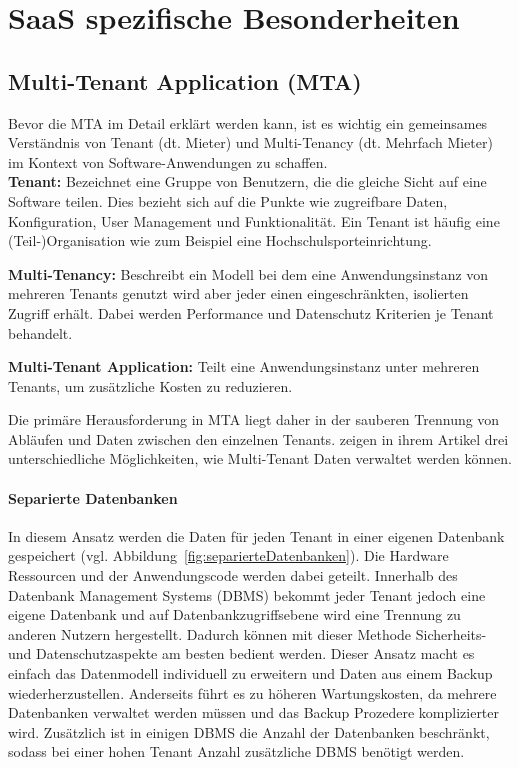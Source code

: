 		\cite[vgl.][]{Fowler.2010}


\section{SaaS spezifische Besonderheiten}
\subsection{Multi-Tenant Application (MTA)}
Bevor die MTA im Detail erklärt werden kann, ist es wichtig ein gemeinsames Verständnis von Tenant (dt. Mieter) und Multi-Tenancy (dt. Mehrfach Mieter) im Kontext von Software-Anwendungen zu schaffen. \cite*[vgl. ][S.2]{Krebs.2012}
\\

\textbf{Tenant:} Bezeichnet eine Gruppe von Benutzern, die die gleiche Sicht auf eine Software teilen. Dies bezieht sich auf die Punkte wie zugreifbare Daten, Konfiguration, User Management und Funktionalität. Ein Tenant ist häufig eine (Teil-)Organisation wie zum Beispiel eine Hochschulsporteinrichtung. 

\textbf{Multi-Tenancy:} Beschreibt ein Modell bei dem eine Anwendungsinstanz von mehreren Tenants genutzt wird aber jeder einen eingeschränkten, isolierten Zugriff erhält. Dabei werden Performance und Datenschutz Kriterien je Tenant behandelt. 

\textbf{Multi-Tenant Application:} Teilt eine Anwendungsinstanz unter mehreren Tenants, um zusätzliche Kosten zu reduzieren. 

Die primäre Herausforderung in MTA liegt daher in der sauberen Trennung von Abläufen und Daten zwischen den einzelnen Tenants. \cite{Chong.2006} zeigen in ihrem Artikel drei unterschiedliche Möglichkeiten, wie Multi-Tenant Daten verwaltet werden können.

\paragraph{Separierte Datenbanken}
In diesem Ansatz werden die Daten für jeden Tenant in einer eigenen Datenbank gespeichert (vgl. Abbildung~\ref{fig:separierteDatenbanken}). Die Hardware Ressourcen und der Anwendungscode werden dabei geteilt. Innerhalb des Datenbank Management Systems (DBMS) bekommt jeder Tenant jedoch eine eigene Datenbank und auf Datenbankzugriffsebene wird eine Trennung zu anderen Nutzern hergestellt. Dadurch können mit dieser Methode Sicherheits- und Datenschutzaspekte am besten bedient werden. Dieser Ansatz macht es einfach das Datenmodell individuell zu erweitern und Daten aus einem Backup wiederherzustellen. Anderseits führt es zu höheren Wartungskosten, da mehrere Datenbanken verwaltet werden müssen und das Backup Prozedere komplizierter wird. Zusätzlich ist in einigen DBMS die Anzahl der Datenbanken beschränkt, sodass bei einer hohen Tenant Anzahl zusätzliche DBMS benötigt werden.

